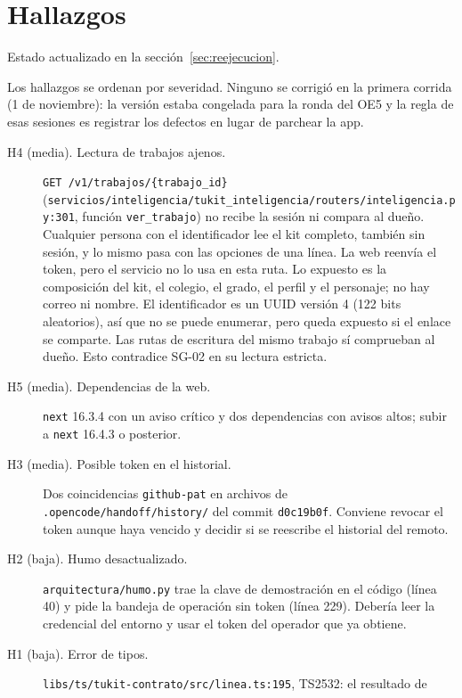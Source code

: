 \documentclass[11pt,letterpaper]{article}
\newcommand{\ruta}[1]{\texttt{\small #1}}
\begin{document}
\section{Hallazgos}\label{sec:hallazgos}

Estado actualizado en la sección~\ref{sec:reejecucion}.

Los hallazgos se ordenan por severidad. Ninguno se corrigió en la primera corrida (1 de noviembre): la versión estaba congelada para la
ronda del OE5 y la regla de esas sesiones es registrar los defectos en lugar de parchear la app.

\begin{description}
  \item[H4 (media). Lectura de trabajos ajenos.] \ruta{GET /\allowbreak{}v1/\allowbreak{}trabajos/\allowbreak{}\{trabajo\_\allowbreak{}id\}}
  (\ruta{servicios/\allowbreak{}inteligencia/\allowbreak{}tukit\_\allowbreak{}inteligencia/\allowbreak{}routers/\allowbreak{}inteligencia.py:301}, función
  \ruta{ver\_\allowbreak{}trabajo}) no recibe la sesión ni compara al dueño. Cualquier
  persona con el identificador lee el kit completo, también sin sesión, y lo mismo pasa con las opciones de una
  línea. La web reenvía el token, pero el servicio no lo usa en esta ruta. Lo expuesto es la composición del kit, el colegio, el grado, el perfil y el personaje; no hay correo
  ni nombre. El identificador es un UUID versión 4 (122 bits aleatorios), así que no se puede enumerar, pero
  queda expuesto si el enlace se comparte. Las rutas de escritura del mismo trabajo sí comprueban al dueño. Esto
  contradice SG-02 en su lectura estricta.
  \item[H5 (media). Dependencias de la web.] \ruta{next} 16.3.4 con un aviso crítico y dos dependencias con
  avisos altos; subir a \ruta{next} 16.4.3 o posterior.
  \item[H3 (media). Posible token en el historial.] Dos coincidencias \ruta{github-pat} en archivos de
  \ruta{.opencode/\allowbreak{}handoff/\allowbreak{}history/} del commit \ruta{d0c19b0f}. Conviene revocar el token aunque haya vencido y
  decidir si se reescribe el historial del remoto.
  \item[H2 (baja). Humo desactualizado.] \ruta{arquitectura/\allowbreak{}humo.py} trae la clave de demostración en el código
  (línea 40) y pide la bandeja de operación sin token (línea 229). Debería leer la credencial del entorno y
  usar el token del operador que ya obtiene.
  \item[H1 (baja). Error de tipos.] \ruta{libs/\allowbreak{}ts/\allowbreak{}tukit-contrato/\allowbreak{}src/\allowbreak{}linea.ts:195}, TS2532: el resultado de

\end{description}
\end{document}
